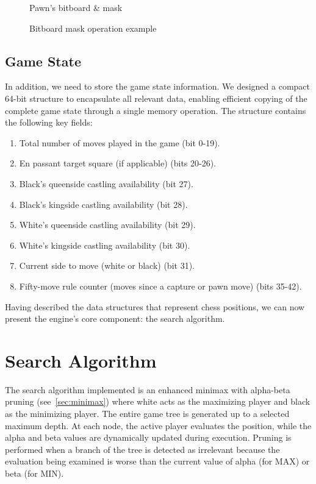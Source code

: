 \begin{figure}[H]
\begin{minipage}[c]{0.30\textwidth}
        \caption*{Pawn's bitboard \& mask}
    \end{minipage}
    \caption{Bitboard mask operation example}\label{fig:bitboardMaskOperation}
    \vspace{-\baselineskip}
\end{figure}

\subsection{Game State}

\noindent In addition, we need to store the game state information. We designed a compact 64-bit structure to encapsulate all relevant data, enabling efficient copying of the complete game state through a single memory operation. The structure contains the following key fields:

\begin{enumerate}
    \item Total number of moves played in the game (bit 0-19). 
    \item En passant target square (if applicable) (bits 20-26).
    \item Black's queenside castling availability (bit 27).
    \item Black's kingside castling availability (bit 28).
    \item White's queenside castling availability (bit 29).
    \item White's kingside castling availability (bit 30).
    \item Current side to move (white or black) (bit 31).
    \item Fifty-move rule counter (moves since a capture or pawn move) (bits 35-42).
\end{enumerate}

\vspace{1em}

\noindent Having described the data structures that represent chess positions, we can now present the engine's core component: the search algorithm.

\section{Search Algorithm}

The search algorithm implemented is an enhanced minimax with alpha-beta pruning (see~\cref{sec:minimax}) where white acts as the maximizing player and black as the minimizing player. The entire game tree is generated up to a selected maximum depth. At each node, the active player evaluates the position, while the alpha and beta values are dynamically updated during execution. Pruning is performed when a branch of the tree is detected as irrelevant because the evaluation being examined is worse than the current value of alpha (for MAX) or beta (for MIN).


